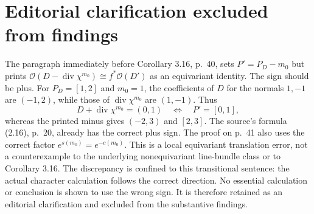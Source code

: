 \documentclass[10pt]{article}
\begin{document}
\section*{Editorial clarification excluded from findings}
The paragraph immediately before Corollary 3.16, p. 40, sets \(P'=P_D-m_0\) but prints \(\mathcal O(D-\operatorname{div}\chi^{m_0})
 \cong f^*\mathcal O(D')\) as an equivariant identity. The sign should be plus. For \(P_D=[1,2]\) and \(m_0=1\), the coefficients of \(D\) for the normals \(1,-1\) are \((-1,2)\), while those of \(\operatorname{div}\chi^{m_0}\) are \((1,-1)\). Thus \[D+\operatorname{div}\chi^{m_0}=(0,1)
 \quad\Longleftrightarrow\quad P'=[0,1],\] whereas the printed minus gives \((-2,3)\) and \([2,3]\). The source’s formula (2.16), p. 20, already has the correct plus sign. The proof on p. 41 also uses the correct factor \(e^{s(m_0)}=e^{-c(m_0)}\). This is a local equivariant translation error, not a counterexample to the underlying nonequivariant line-bundle class or to Corollary 3.16. The discrepancy is confined to this transitional sentence: the actual character calculation follows the correct direction. No essential calculation or conclusion is shown to use the wrong sign. It is therefore retained as an editorial clarification and excluded from the substantive findings.\par
\end{document}
